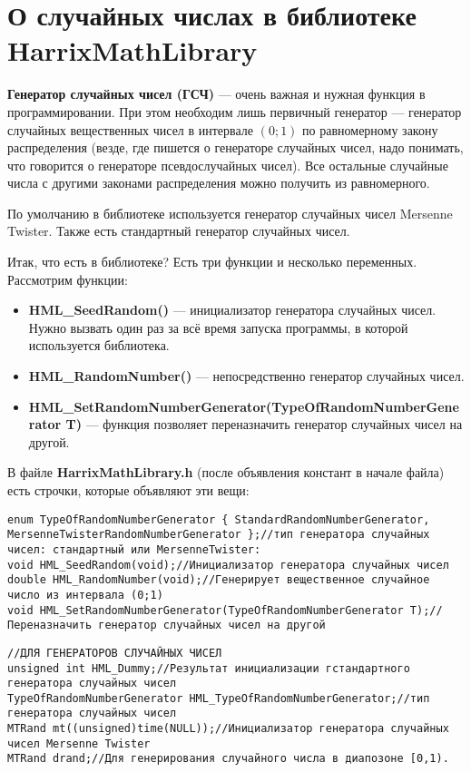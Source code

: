 \newpage
\section{О случайных числах в библиотеке HarrixMathLibrary}\label{section_random}

\textbf{Генератор случайных чисел (ГСЧ)} --- очень важная и нужная функция в программировании. При этом необходим лишь первичный генератор --- генератор случайных вещественных чисел в интервале $\left( 0; 1\right)$ по равномерному закону распределения (везде, где пишется о генераторе случайных чисел, надо понимать, что говорится о генераторе псевдослучайных чисел). Все остальные случайные числа с другими законами распределения можно получить из равномерного.

По умолчанию в библиотеке используется генератор случайных чисел Mersenne Twister. Также есть стандартный генератор случайных чисел.


Итак, что есть в библиотеке? Есть три функции и несколько переменных. Рассмотрим функции:
\begin{itemize}
\item \textbf{HML\_SeedRandom()} --- инициализатор генератора случайных чисел. Нужно вызвать один раз за всё время запуска программы, в которой используется библиотека.
\item \textbf{HML\_RandomNumber()} --- непосредственно генератор случайных чисел.
\item \textbf{HML\_SetRandomNumberGenerator(TypeOfRandomNumberGenerator T)} --- функция позволяет переназначить генератор случайных чисел на другой.
\end{itemize}

В файле \textbf{HarrixMathLibrary.h} (после объявления констант в начале файла) есть строчки, которые объявляют эти вещи:
\begin{lstlisting}[label=random_h,caption=Объявление функций в HarrixMathLibrary.h]
enum TypeOfRandomNumberGenerator { StandardRandomNumberGenerator, MersenneTwisterRandomNumberGenerator };//тип генератора случайных чисел: стандартный или MersenneTwister:
void HML_SeedRandom(void);//Инициализатор генератора случайных чисел
double HML_RandomNumber(void);//Генерирует вещественное случайное число из интервала (0;1)
void HML_SetRandomNumberGenerator(TypeOfRandomNumberGenerator T);//Переназначить генератор случайных чисел на другой
\end{lstlisting}

\begin{lstlisting}[label=random_h_cpp,caption=Объявление переменной в HarrixMathLibrary.cpp]
//ДЛЯ ГЕНЕРАТОРОВ СЛУЧАЙНЫХ ЧИСЕЛ
unsigned int HML_Dummy;//Результат инициализации гстандартного генератора случайных чисел
TypeOfRandomNumberGenerator HML_TypeOfRandomNumberGenerator;//тип генератора случайных чисел
MTRand mt((unsigned)time(NULL));//Инициализатор генератора случайных чисел Mersenne Twister
MTRand drand;//Для генерирования случайного числа в диапозоне [0,1).
\end{lstlisting}

